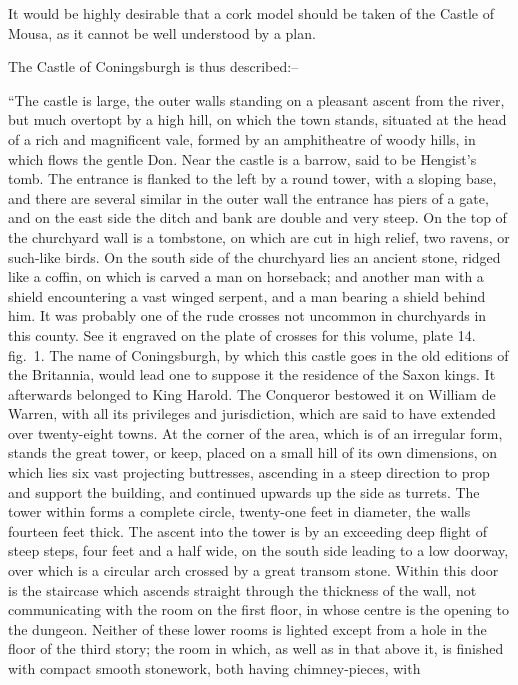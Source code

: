 It would be highly desirable that a cork model should be taken of the
Castle of Mousa, as it cannot be well understood by a plan.

The Castle of Coningsburgh is thus described:--

``The castle is large, the outer walls standing on a pleasant ascent
from the river, but much overtopt by a high hill, on which the town
stands, situated at the head of a rich and magnificent vale, formed by
an amphitheatre of woody hills, in which flows the gentle Don. Near the
castle is a barrow, said to be Hengist's tomb. The entrance is flanked
to the left by a round tower, with a sloping base, and there are several
similar in the outer wall the entrance has piers of a gate, and on the
east side the ditch and bank are double and very steep. On the top of
the churchyard wall is a tombstone, on which are cut in high relief, two
ravens, or such-like birds. On the south side of the churchyard lies an
ancient stone, ridged like a coffin, on which is carved a man on
horseback; and another man with a shield encountering a vast winged
serpent, and a man bearing a shield behind him. It was probably one of
the rude crosses not uncommon in churchyards in this county. See it
engraved on the plate of crosses for this volume, plate 14. fig.~1. The
name of Coningsburgh, by which this castle goes in the old editions of
the Britannia, would lead one to suppose it the residence of the Saxon
kings. It afterwards belonged to King Harold. The Conqueror bestowed it
on William de Warren, with all its privileges and jurisdiction, which
are said to have extended over twenty-eight towns. At the corner of the
area, which is of an irregular form, stands the great tower, or keep,
placed on a small hill of its own dimensions, on which lies six vast
projecting buttresses, ascending in a steep direction to prop and
support the building, and continued upwards up the side as turrets. The
tower within forms a complete circle, twenty-one feet in diameter, the
walls fourteen feet thick. The ascent into the tower is by an exceeding
deep flight of steep steps, four feet and a half wide, on the south side
leading to a low doorway, over which is a circular arch crossed by a
great transom stone. Within this door is the staircase which ascends
straight through the thickness of the wall, not communicating with the
room on the first floor, in whose centre is the opening to the dungeon.
Neither of these lower rooms is lighted except from a hole in the floor
of the third story; the room in which, as well as in that above it, is
finished with compact smooth stonework, both having chimney-pieces, with
